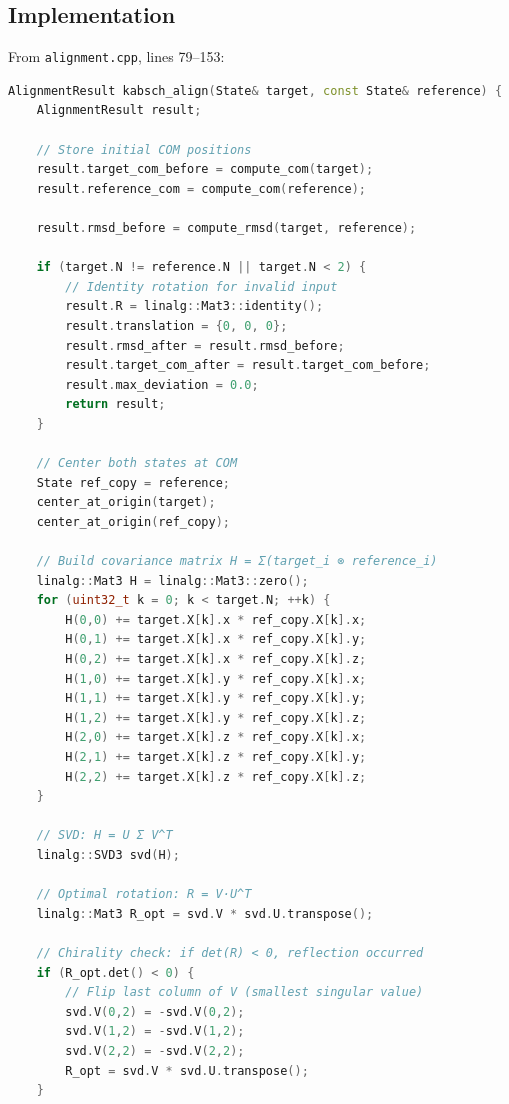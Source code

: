 \documentclass[11pt]{article}
\begin{document}
\subsection{Implementation}

From \texttt{alignment.cpp}, lines 79--153:

\begin{lstlisting}[language=C++]
AlignmentResult kabsch_align(State& target, const State& reference) {
    AlignmentResult result;
    
    // Store initial COM positions
    result.target_com_before = compute_com(target);
    result.reference_com = compute_com(reference);
    
    result.rmsd_before = compute_rmsd(target, reference);
    
    if (target.N != reference.N || target.N < 2) {
        // Identity rotation for invalid input
        result.R = linalg::Mat3::identity();
        result.translation = {0, 0, 0};
        result.rmsd_after = result.rmsd_before;
        result.target_com_after = result.target_com_before;
        result.max_deviation = 0.0;
        return result;
    }
    
    // Center both states at COM
    State ref_copy = reference;
    center_at_origin(target);
    center_at_origin(ref_copy);
    
    // Build covariance matrix H = Σ(target_i ⊗ reference_i)
    linalg::Mat3 H = linalg::Mat3::zero();
    for (uint32_t k = 0; k < target.N; ++k) {
        H(0,0) += target.X[k].x * ref_copy.X[k].x;
        H(0,1) += target.X[k].x * ref_copy.X[k].y;
        H(0,2) += target.X[k].x * ref_copy.X[k].z;
        H(1,0) += target.X[k].y * ref_copy.X[k].x;
        H(1,1) += target.X[k].y * ref_copy.X[k].y;
        H(1,2) += target.X[k].y * ref_copy.X[k].z;
        H(2,0) += target.X[k].z * ref_copy.X[k].x;
        H(2,1) += target.X[k].z * ref_copy.X[k].y;
        H(2,2) += target.X[k].z * ref_copy.X[k].z;
    }
    
    // SVD: H = U Σ V^T
    linalg::SVD3 svd(H);
    
    // Optimal rotation: R = V·U^T
    linalg::Mat3 R_opt = svd.V * svd.U.transpose();
    
    // Chirality check: if det(R) < 0, reflection occurred
    if (R_opt.det() < 0) {
        // Flip last column of V (smallest singular value)
        svd.V(0,2) = -svd.V(0,2);
        svd.V(1,2) = -svd.V(1,2);
        svd.V(2,2) = -svd.V(2,2);
        R_opt = svd.V * svd.U.transpose();
    }
    

\end{lstlisting}
\end{document}

